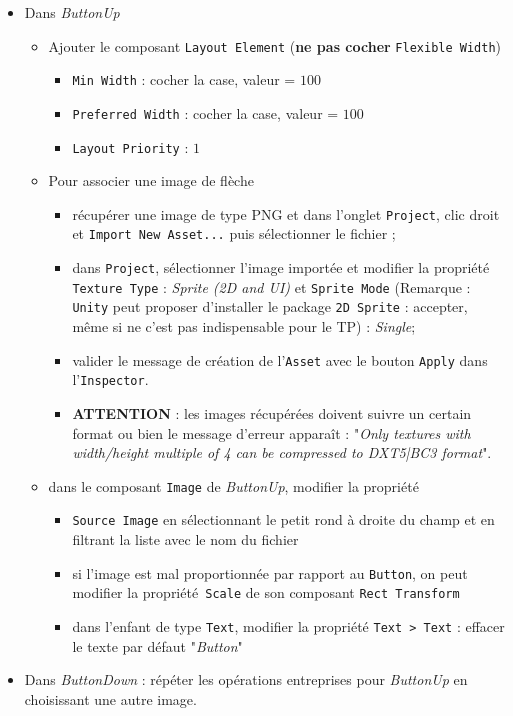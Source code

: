 \documentclass[a4paper,10pt]{article}
\newenvironment{solution}%
{\begin{tcolorbox}[breakable,colback=red!5!white,colframe=red!75!black,title=Solution]}%
{\end{tcolorbox}}
\begin{document}
\begin{solution}
\begin{itemize}
	\item Dans \textit{ButtonUp}
		\begin{itemize}
			\item Ajouter le composant  \texttt{Layout Element} (\textbf{ne pas cocher} \texttt{Flexible Width})
			\begin{itemize}
				\item \texttt{Min Width} : cocher la case, valeur = $100$
				\item \texttt{Preferred Width} : cocher la case, valeur = $100$
				\item \texttt{Layout Priority} : $1$
			\end{itemize}	
			\item Pour associer une image de flèche 
			\begin{itemize}
				\item récupérer une image de type PNG et dans l'onglet \texttt{Project}, clic droit et \texttt{Import New Asset...} puis sélectionner le fichier ;
				\item dans \texttt{Project}, sélectionner l'image importée et modifier la propriété \texttt{Texture Type} : \textit{Sprite (2D and UI)} et \texttt{Sprite Mode} (Remarque : \texttt{Unity} peut proposer d'installer le package \texttt{2D Sprite} : accepter, même si ne c'est pas indispensable pour le TP) : \textit{Single};				
				\item valider le message de création de l'\texttt{Asset} avec le bouton \texttt{Apply} dans l'\texttt{Inspector}.
				\item \textbf{ATTENTION} : les images récupérées doivent suivre un certain format ou bien le message d'erreur apparaît : "\textit{Only textures with width/height multiple of 4 can be compressed to DXT5|BC3 format}".
			\end{itemize}	
			\item dans le composant \texttt{Image} de \textit{ButtonUp}, modifier la propriété
			\begin{itemize}
				\item \texttt{Source Image} en sélectionnant le petit rond à droite du champ et en filtrant la liste avec le nom du fichier
				\item si l'image est mal proportionnée par rapport au \texttt{Button}, on peut modifier la propriété\texttt{ Scale} de son composant \texttt{Rect Transform}
				\item dans l'enfant de type \texttt{Text}, modifier la propriété \texttt{Text > Text} : effacer le texte par défaut "\textit{Button}"
			\end{itemize}
		\end{itemize}	
	\item Dans \textit{ButtonDown} : répéter les opérations entreprises pour \textit{ButtonUp} en choisissant une autre image.
\end{itemize}


\end{solution}
\end{document}
